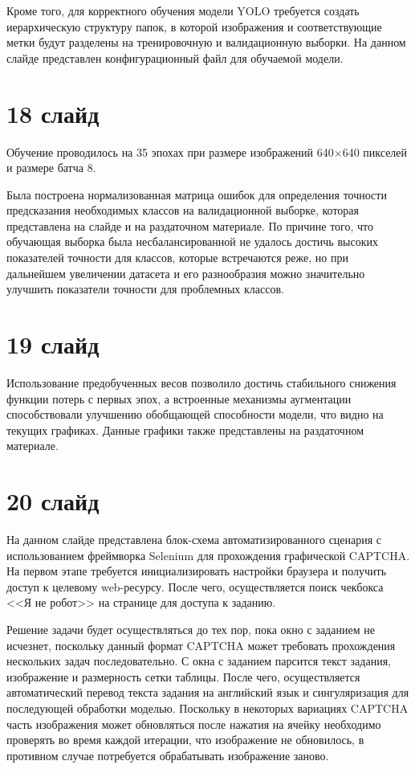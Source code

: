 \documentclass{altsu-report}
\begin{document}
Кроме того, для корректного обучения модели YOLO требуется создать иерархическую 
структуру папок, в которой изображения и соответствующие метки будут разделены на 
тренировочную и валидационную выборки. На данном слайде представлен 
конфигурационный файл для обучаемой модели.

\section*{18 слайд}

Обучение проводилось на 35 эпохах при размере изображений 640×640 пикселей и 
размере батча 8.

Была построена нормализованная матрица ошибок для определения точности 
предсказания необходимых классов на валидационной выборке, которая представлена 
на слайде и на раздаточном материале. По причине того, что обучающая выборка была 
несбалансированной не удалось достичь высоких показателей точности для классов, 
которые встречаются реже, но при дальнейшем увеличении датасета и его 
разнообразия можно значительно улучшить показатели точности для проблемных 
классов.

\section*{19 слайд}

Использование предобученных весов позволило достичь стабильного снижения функции 
потерь с первых эпох, а встроенные механизмы аугментации способствовали улучшению 
обобщающей способности модели, что видно на текущих графиках. Данные графики 
также представлены на раздаточном материале.

\section*{20 слайд}

На данном слайде представлена блок-схема автоматизированного сценария с 
использованием фреймворка Selenium для прохождения графической CAPTCHA. 
На первом этапе требуется инициализировать настройки браузера и получить доступ 
к целевому web-ресурсу. После чего, осуществляется поиск чекбокса <<Я не робот>> 
на странице для доступа к заданию.

Решение задачи будет осуществляться до тех пор, пока окно с заданием не исчезнет, 
поскольку данный формат CAPTCHA может требовать прохождения нескольких задач 
последовательно. С окна с заданием парсится текст задания, изображение и 
размерность сетки таблицы. После чего, осуществляется автоматический перевод 
текста задания на английский язык и сингуляризация для последующей обработки 
моделью. Поскольку в некоторых вариациях CAPTCHA часть изображения может 
обновляться после нажатия на ячейку необходимо проверять во время каждой 
итерации, что изображение не обновилось, в противном случае потребуется 
обрабатывать изображение заново.
\end{document}
